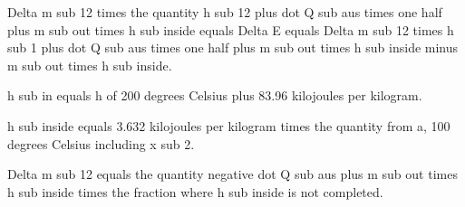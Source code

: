 Delta m sub 12 times the quantity h sub 12 plus dot Q sub aus times one half plus m sub out times h sub inside equals Delta E equals Delta m sub 12 times h sub 1 plus dot Q sub aus times one half plus m sub out times h sub inside minus m sub out times h sub inside.

h sub in equals h of 200 degrees Celsius plus 83.96 kilojoules per kilogram.

h sub inside equals 3.632 kilojoules per kilogram times the quantity from a, 100 degrees Celsius including x sub 2.

Delta m sub 12 equals the quantity negative dot Q sub aus plus m sub out times h sub inside times the fraction where h sub inside is not completed.